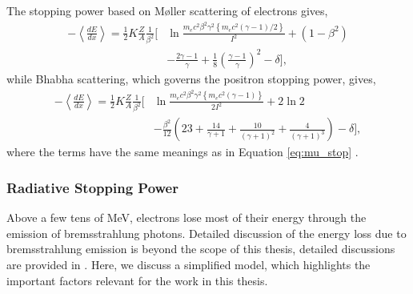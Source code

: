 The stopping power based on M{\o}ller scattering of electrons gives,
\begin{align*}
	- \left< \frac{dE}{dx} \right> = \frac{1}{2} K \frac{Z}{A} \frac{1}{\beta^2}
	\bigg[ &\ln \frac{m_e c^2 \beta^2 \gamma^2 \left\{ m_e c^2 (\gamma - 1) / 2
	\right\} }{I^2} + (1 - \beta^2) \\
	&- \frac{2\gamma - 1}{\gamma} + \frac{1}{8} 
	\left(\frac{\gamma - 1}{\gamma}\right)^2 - \delta \bigg],
\end{align*}
while Bhabha scattering, which governs the positron stopping power, gives,
\begin{align*}
	- \left< \frac{dE}{dx} \right> = \frac{1}{2} K \frac{Z}{A} \frac{1}{\beta^2}
	\bigg[ &\ln \frac{m_e c^2 \beta^2 \gamma^2 \left\{ m_e c^2 (\gamma - 1) 
	\right\} }{2 I^2} 
	+ 2 \ln 2  \\ &-\frac{\beta^2}{12} \left(23 + \frac{14}{\gamma + 1} +
	\frac{10}{(\gamma + 1)^2} + \frac{4}{(\gamma + 1)^3}\right) - \delta \bigg],
\end{align*}
where the terms have the same meanings as in Equation \ref{eq:mu_stop}
\cite{PhysRevD.98.030001}.

\subsubsection*{Radiative Stopping Power}
Above a few tens of MeV, electrons lose most of their energy through the 
emission of bremsstrahlung photons. Detailed discussion of the energy loss due
to bremsstrahlung emission is beyond the scope of this thesis, detailed
discussions are provided in \cite{PhysRevD.98.030001, Tsai:1973py}. Here, we 
discuss a simplified model, which highlights the important factors relevant for 
the work in this thesis.

